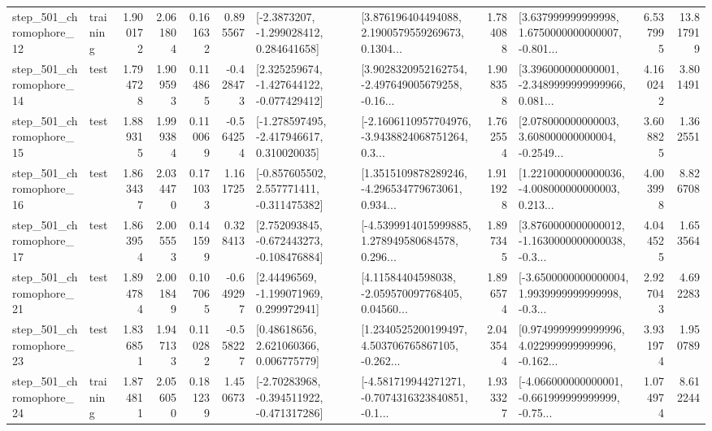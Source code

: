 \begin{tabular}{llrrrrllrlrr}
  step\_501\_chromophore\_12 &  training &      1.900172 &    2.061804 &      0.161632 &  0.895567 &     [-2.3873207, -1.299028412, 0.284641658] &  [3.876196404494088, 2.1900579559269673, 0.1304... &       1.784088 &  [3.637999999999998, 1.6750000000000007, -0.801... &            6.537995 &         13.817919 \\
  step\_501\_chromophore\_14 &      test &      1.794728 &    1.909593 &      0.114865 & -0.428473 &   [2.325259674, -1.427644122, -0.077429412] &  [3.9028320952162754, -2.497649005679258, -0.16... &       1.908358 &  [3.396000000000001, -2.3489999999999966, 0.081... &            4.160242 &          3.801491 \\
  step\_501\_chromophore\_15 &      test &      1.889315 &    1.999384 &      0.110069 & -0.564254 &   [-1.278597495, -2.417946617, 0.310020035] &  [-2.1606110957704976, -3.9438824068751264, 0.3... &       1.762554 &  [2.078000000000003, 3.608000000000004, -0.2549... &            3.608825 &          1.362551 \\
  step\_501\_chromophore\_16 &      test &      1.863437 &    2.034470 &      0.171033 &  1.161725 &   [-0.857605502, 2.557771411, -0.311475382] &  [1.3515109878289246, -4.296534779673061, 0.934... &       1.911928 &  [1.2210000000000036, -4.008000000000003, 0.213... &            4.003998 &          8.826708 \\
  step\_501\_chromophore\_17 &      test &      1.863954 &    2.005553 &      0.141599 &  0.328413 &   [2.752093845, -0.672443273, -0.108476884] &  [-4.5399914015999885, 1.278949580684578, 0.296... &       1.897345 &  [3.8760000000000012, -1.1630000000000038, -0.3... &            4.044525 &          1.653564 \\
  step\_501\_chromophore\_21 &      test &      1.894784 &    2.001849 &      0.107065 & -0.649297 &     [2.44496569, -1.199071969, 0.299972941] &  [4.11584404598038, -2.059570097768405, 0.04560... &       1.896574 &  [-3.6500000000000004, 1.9939999999999998, -0.3... &            2.927043 &          4.692283 \\
  step\_501\_chromophore\_23 &      test &      1.836851 &    1.947133 &      0.110282 & -0.558227 &      [0.48618656, 2.621060366, 0.006775779] &  [1.2340525200199497, 4.503706765867105, -0.262... &       2.043544 &  [0.9749999999999996, 4.022999999999996, -0.162... &            3.931974 &          1.950789 \\
  step\_501\_chromophore\_24 &  training &      1.874811 &    2.056050 &      0.181239 &  1.450673 &   [-2.70283968, -0.394511922, -0.471317286] &  [-4.581719944271271, -0.7074316323840851, -0.1... &       1.933327 &  [-4.066000000000001, -0.661999999999999, -0.75... &            1.074974 &          8.612244 \\

\end{tabular}
